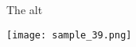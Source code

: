 \documentclass{beamer}
\begin{document}
\begin{frame}{The alt}
    \begin{center}
        \texttt{[image: sample\_39.png]}
    \end{center}
\end{frame}
\end{document}
